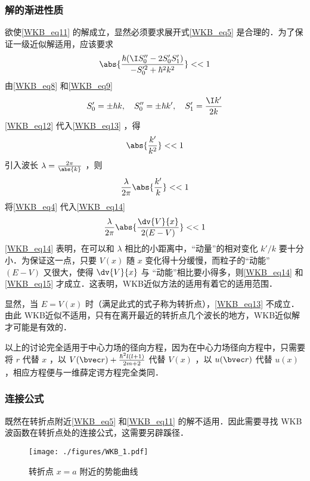 \subsubsection{解的渐进性质}
欲使\autoref{WKB_eq11} 的解成立，显然必须要求展开式\autoref{WKB_eq5} 是合理的．为了保证一级近似解适用，应该要求
\begin{equation}\label{WKB_eq13}
\abs{\frac{\hbar(\I S_0''-2S_0'S_1')}{-S_0'^2+\hbar^2k^2}}<<1
\end{equation}
由\autoref{WKB_eq8} 和\autoref{WKB_eq9} 
\begin{equation}\label{WKB_eq12}
S_0'=\pm\hbar k,\quad S_0''=\pm\hbar k',\quad S_1'=\frac{\I k'}{2k}
\end{equation}
\autoref{WKB_eq12} 代入\autoref{WKB_eq13} ，得
\begin{equation}
\abs{\frac{k'}{k^2}}<<1
\end{equation}
引入波长 $\lambda=\frac{2\pi}{\abs{k}}$ ，则
\begin{equation}\label{WKB_eq14}
\frac{\lambda}{2\pi}\abs{\frac{k'}{k}}<<1
\end{equation}
将\autoref{WKB_eq4} 代入\autoref{WKB_eq14} 
\begin{equation}\label{WKB_eq15}
\frac{\lambda}{2\pi}\abs{\frac{\dv{V}{x}}{2(E-V)}}<<1
\end{equation}
\autoref{WKB_eq14} 表明，在可以和 $\lambda$ 相比的小距离中，“动量”的相对变化 $k'/k$ 要十分小．为保证这一点，只要 $V(x)$ 随 $x$ 变化得十分缓慢，而粒子的“动能” $(E-V)$ 又很大，使得 $\dv{V}{x}$ 与 “动能”相比要小得多，则\autoref{WKB_eq14} 和\autoref{WKB_eq15} 才成立．这表明，WKB近似方法的适用有着它的适用范围．

显然，当 $E=V(x)$ 时（满足此式的式子称为转折点），\autoref{WKB_eq13} 不成立．由此 WKB近似不适用，只有在离开最近的转折点几个波长的地方，WKB近似解才可能是有效的．

以上的讨论完全适用于中心力场的径向方程，因为在中心力场径向方程中，只需要将 $r$ 代替 $x$ ，以 $V(\bvec r)+\frac{\hbar^2l(l+1)}{2m+2}$ 代替 $V(x)$ ，以 $u(\bvec r)$ 代替 $u(x)$ ，相应方程便与一维薛定谔方程完全类同．
\subsubsection{连接公式}
既然在转折点附近\autoref{WKB_eq5} 和\autoref{WKB_eq11} 的解不适用．因此需要寻找 WKB波函数在转折点处的连接公式，这需要另辟蹊径．
\begin{figure}[ht]
\centering
\texttt{[image: ./figures/WKB\_1.pdf]}
\caption{转折点 $x=a$ 附近的势能曲线} \label{WKB_fig1}
\end{figure}

